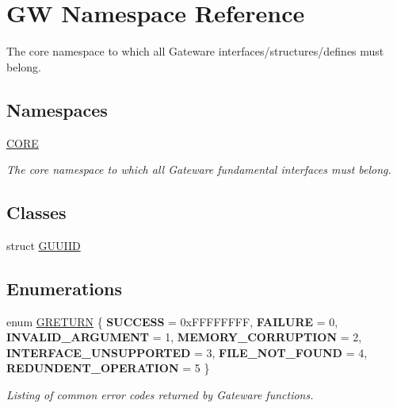 \hypertarget{namespace_g_w}{}\section{GW Namespace Reference}
\label{namespace_g_w}


The core namespace to which all Gateware interfaces/structures/defines must belong.  


\subsection*{Namespaces}
\begin{DoxyCompactItemize}
\item 
 \hyperlink{namespace_g_w_1_1_c_o_r_e}{C\+O\+RE}
\begin{DoxyCompactList}\small\item\em The core namespace to which all Gateware fundamental interfaces must belong. \end{DoxyCompactList}\end{DoxyCompactItemize}
\subsection*{Classes}
\begin{DoxyCompactItemize}
\item 
struct \hyperlink{struct_g_w_1_1_g_u_u_i_i_d}{G\+U\+U\+I\+ID}
\end{DoxyCompactItemize}
\subsection*{Enumerations}
\begin{DoxyCompactItemize}
\item 
\hypertarget{namespace_g_w_a69b1aaebac1cac8049825f035884c95b}{}\label{namespace_g_w_a69b1aaebac1cac8049825f035884c95b} 
enum \hyperlink{namespace_g_w_a69b1aaebac1cac8049825f035884c95b}{G\+R\+E\+T\+U\+RN} \{ \newline
{\bfseries S\+U\+C\+C\+E\+SS} = 0x\+F\+F\+F\+F\+F\+F\+FF, 
{\bfseries F\+A\+I\+L\+U\+RE} = 0, 
{\bfseries I\+N\+V\+A\+L\+I\+D\+\_\+\+A\+R\+G\+U\+M\+E\+NT} = 1, 
{\bfseries M\+E\+M\+O\+R\+Y\+\_\+\+C\+O\+R\+R\+U\+P\+T\+I\+ON} = 2, 
\newline
{\bfseries I\+N\+T\+E\+R\+F\+A\+C\+E\+\_\+\+U\+N\+S\+U\+P\+P\+O\+R\+T\+ED} = 3, 
{\bfseries F\+I\+L\+E\+\_\+\+N\+O\+T\+\_\+\+F\+O\+U\+ND} = 4, 
{\bfseries R\+E\+D\+U\+N\+D\+E\+N\+T\+\_\+\+O\+P\+E\+R\+A\+T\+I\+ON} = 5
 \}\begin{DoxyCompactList}\small\item\em Listing of common error codes returned by Gateware functions. \end{DoxyCompactList}
\end{DoxyCompactItemize}


